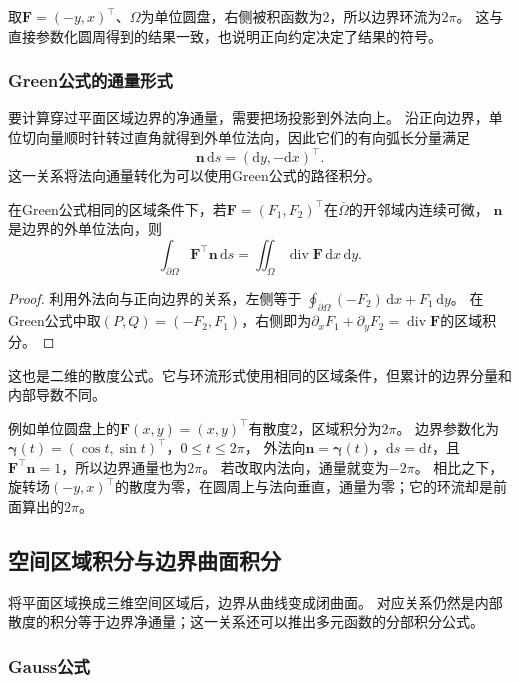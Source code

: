 取$\bm F=(-y,x)^\top$、$\Omega$为单位圆盘，右侧被积函数为$2$，所以边界环流为$2\pi$。
这与直接参数化圆周得到的结果一致，也说明正向约定决定了结果的符号。

\subsubsection{Green公式的通量形式}

要计算穿过平面区域边界的净通量，需要把场投影到外法向上。
沿正向边界，单位切向量顺时针转过直角就得到外单位法向，因此它们的有向弧长分量满足
\[
 \bm n\,\mathrm ds=(\mathrm dy,-\mathrm dx)^\top.
\]
这一关系将法向通量转化为可以使用Green公式的路径积分。
\begin{theorem}[平面区域的通量公式]
\label{thm:multivariable-planar-flux}
在Green公式相同的区域条件下，若$\bm F=(F_1,F_2)^\top$在$\overline\Omega$的开邻域内连续可微，
$\bm n$是边界的外单位法向，则
\[
 \int_{\partial\Omega}\bm F^\top\bm n\,\mathrm ds
 =\iint_\Omega\operatorname{div}\bm F\,\mathrm dx\,\mathrm dy.
\]
\end{theorem}
\begin{proof}
利用外法向与正向边界的关系，左侧等于
$\oint_{\partial\Omega}(-F_2)\,\mathrm dx+F_1\,\mathrm dy$。
在Green公式中取$(P,Q)=(-F_2,F_1)$，右侧即为$\partial_xF_1+\partial_yF_2=\operatorname{div}\bm F$的区域积分。
\end{proof}
这也是二维的散度公式。它与环流形式使用相同的区域条件，但累计的边界分量和内部导数不同。

例如单位圆盘上的$\bm F(x,y)=(x,y)^\top$有散度$2$，区域积分为$2\pi$。
边界参数化为$\bm\gamma(t)=(\cos t,\sin t)^\top$，$0\leq t\leq2\pi$，
外法向$\bm n=\bm\gamma(t)$，$\mathrm ds=\mathrm dt$，且$\bm F^\top\bm n=1$，所以边界通量也为$2\pi$。
若改取内法向，通量就变为$-2\pi$。
相比之下，旋转场$(-y,x)^\top$的散度为零，在圆周上与法向垂直，通量为零；它的环流却是前面算出的$2\pi$。

\subsection{空间区域积分与边界曲面积分}

将平面区域换成三维空间区域后，边界从曲线变成闭曲面。
对应关系仍然是内部散度的积分等于边界净通量；这一关系还可以推出多元函数的分部积分公式。

\subsubsection{Gauss公式}

